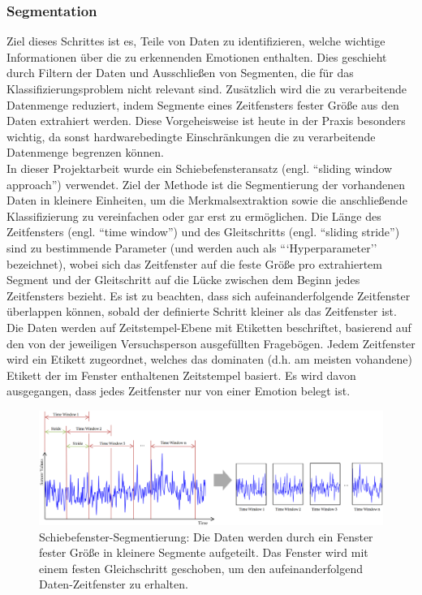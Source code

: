 \subsubsection{Segmentation} \label{segmentation-subsubsec}


Ziel dieses Schrittes ist es, Teile von Daten zu identifizieren, welche wichtige Informationen über die zu erkennenden Emotionen enthalten. 
Dies geschieht durch Filtern der Daten und Ausschließen von Segmenten, die für das Klassifizierungsproblem nicht relevant sind.
Zusätzlich wird die zu verarbeitende Datenmenge reduziert, indem Segmente eines Zeitfensters fester Größe aus den Daten extrahiert werden.
Diese Vorgeheisweise ist heute in der Praxis besonders wichtig, da sonst hardwarebedingte Einschränkungen die zu verarbeitende Datenmenge begrenzen können. \\


In dieser Projektarbeit wurde ein Schiebefensteransatz (engl. ``sliding window approach'') verwendet. 
Ziel der Methode ist die Segmentierung der vorhandenen Daten in kleinere Einheiten, um die Merkmalsextraktion sowie die anschließende Klassifizierung zu vereinfachen oder gar erst zu ermöglichen.
Die Länge des Zeitfensters (engl. ``time window'') und des Gleitschritts (engl. ``sliding stride'') sind zu bestimmende Parameter (und werden auch als ```Hyperparameter'' bezeichnet), wobei sich das Zeitfenster auf die feste Größe pro extrahiertem Segment und der Gleitschritt auf die Lücke zwischen dem Beginn jedes Zeitfensters bezieht.
Es ist zu beachten, dass sich aufeinanderfolgende Zeitfenster überlappen können, sobald der definierte Schritt kleiner als das Zeitfenster ist. \\


Die Daten werden auf Zeitstempel-Ebene mit Etiketten beschriftet, basierend auf den von der jeweiligen Versuchsperson ausgefüllten Fragebögen. 
Jedem Zeitfenster wird ein Etikett zugeordnet, welches das dominaten (d.h. am meisten vohandene) Etikett der im Fenster enthaltenen Zeitstempel basiert. Es wird davon ausgegangen, dass jedes Zeitfenster nur von einer Emotion belegt ist. \\


\begin{figure}[h]
\includegraphics[width=\textwidth]{Images/segmentation.png} 
\caption{\small{Schiebefenster-Segmentierung: Die Daten werden durch ein Fenster fester Größe in kleinere Segmente aufgeteilt. Das Fenster wird mit einem festen Gleichschritt geschoben, um den aufeinanderfolgend Daten-Zeitfenster zu erhalten. }}
\end{figure} 